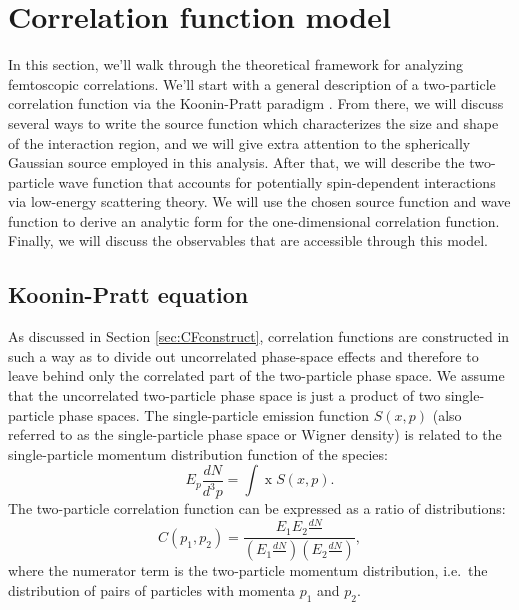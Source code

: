 \section{Correlation function model}
\label{sec:CorrelationFunctionModel}

In this section, we'll walk through the theoretical framework for analyzing femtoscopic correlations.
We'll start with a general description of a two-particle correlation function via the Koonin-Pratt paradigm \cite{Koonin:1977fh, Pratt:1990zq, Lisa:2005dd}.
From there, we will discuss several ways to write the source function which characterizes the size and shape of the interaction region, and we will give extra attention to the spherically Gaussian source employed in this analysis.
After that, we will describe the two-particle wave function that accounts for potentially spin-dependent interactions via low-energy scattering theory.
We will use the chosen source function and wave function to derive an analytic form for the one-dimensional correlation function.
Finally, we will discuss the observables that are accessible through this model.
 
\subsection{Koonin-Pratt equation}
\label{sec:KooninPratt}

As discussed in Section \ref{sec:CFconstruct}, correlation functions are constructed in such a way as to divide out uncorrelated phase-space effects and therefore to leave behind only the correlated part of the two-particle phase space.
We assume that the uncorrelated two-particle phase space is just a product of two single-particle phase spaces.
The single-particle emission function $S(x,p)$ (also referred to as the single-particle phase space or Wigner density) is related to the single-particle momentum distribution function of the species:
\begin{equation}
\label{eq:SingleParticlePhaseSpace}
E_p\frac{dN}{d^3p} = \int \mathop{d^4x} S(x,p).
\end{equation}
The two-particle correlation function can be expressed as a ratio of distributions:
\begin{equation}
\label{eq:YieldsCF}
C(p_1,p_2) = \frac{E_1E_2\frac{dN}{\mathop{d^3p_1}\mathop{d^3p_2}}}{(E_1\frac{dN}{\mathop{d^3p_1}})(E_2\frac{dN}{\mathop{d^3p_2}})},
\end{equation}
where the numerator term is the two-particle momentum distribution, i.e.\ the distribution of pairs of particles with momenta $p_1$ and $p_2$.

